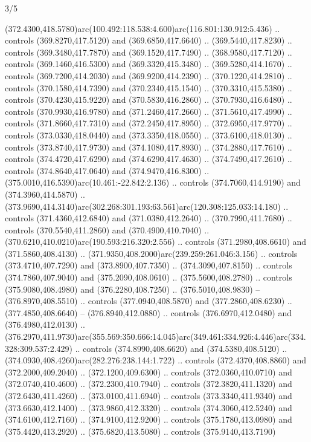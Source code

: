 \begin{flagdescription}{3/5}
\begin{scope}[shift={(0.5\flaglength,0.5\flagwidth)},scale=\flagwidth/510]
\begin{scope}[y=0.80pt, x=0.80pt, yscale=-1.06, xscale=1.06,yshift=-240pt,xshift=-400pt]
\begin{scope}[cm={{0.83333,0.0,0.0,0.83333,(154.64672,48.64761)}}]
\begin{scope}[cm={{0.93334,0.0,0.0,0.93334,(-4.86471,22.64035)}}]
\begin{scope}[draw=black]
  (372.4300,418.5780)arc(100.492:118.538:4.600)arc(116.801:130.912:5.436) ..
  controls (369.8270,417.5120) and (369.6850,417.6640) .. (369.5440,417.8230) ..
  controls (369.3480,417.7870) and (369.1520,417.7490) .. (368.9580,417.7120) ..
  controls (369.1460,416.5300) and (369.3320,415.3480) .. (369.5280,414.1670) ..
  controls (369.7200,414.2030) and (369.9200,414.2390) .. (370.1220,414.2810) ..
  controls (370.1580,414.7390) and (370.2340,415.1540) .. (370.3310,415.5380) ..
  controls (370.4230,415.9220) and (370.5830,416.2860) .. (370.7930,416.6480) ..
  controls (370.9930,416.9780) and (371.2460,417.2660) .. (371.5610,417.4990) ..
  controls (371.8660,417.7310) and (372.2450,417.8950) .. (372.6950,417.9770) ..
  controls (373.0330,418.0440) and (373.3350,418.0550) .. (373.6100,418.0130) ..
  controls (373.8740,417.9730) and (374.1080,417.8930) .. (374.2880,417.7610) ..
  controls (374.4720,417.6290) and (374.6290,417.4630) .. (374.7490,417.2610) ..
  controls (374.8640,417.0640) and (374.9470,416.8300) ..
  (375.0010,416.5390)arc(10.461:-22.842:2.136) .. controls (374.7060,414.9190)
  and (374.3960,414.5870) ..
  (373.9690,414.3140)arc(302.268:301.193:63.561)arc(120.308:125.033:14.180) ..
  controls (371.4360,412.6840) and (371.0380,412.2640) .. (370.7990,411.7680) ..
  controls (370.5540,411.2860) and (370.4900,410.7040) ..
  (370.6210,410.0210)arc(190.593:216.320:2.556) .. controls (371.2980,408.6610)
  and (371.5860,408.4130) .. (371.9350,408.2000)arc(239.259:261.046:3.156) ..
  controls (373.4710,407.7290) and (373.8900,407.7350) .. (374.3090,407.8150) ..
  controls (374.7860,407.9040) and (375.2090,408.0610) .. (375.5600,408.2780) ..
  controls (375.9080,408.4980) and (376.2280,408.7250) .. (376.5010,408.9830) --
  (376.8970,408.5510) .. controls (377.0940,408.5870) and (377.2860,408.6230) ..
  (377.4850,408.6640) -- (376.8940,412.0880) .. controls (376.6970,412.0480) and
  (376.4980,412.0130) ..
  (376.2970,411.9730)arc(355.569:350.666:14.045)arc(349.461:334.926:4.446)arc(334.328:309.537:2.429)
  .. controls (374.8990,408.6620) and (374.5380,408.5120) ..
  (374.0930,408.4260)arc(282.276:238.144:1.722) .. controls (372.4370,408.8860)
  and (372.2000,409.2040) .. (372.1200,409.6300) .. controls (372.0360,410.0710)
  and (372.0740,410.4600) .. (372.2300,410.7940) .. controls (372.3820,411.1320)
  and (372.6430,411.4260) .. (373.0100,411.6940) .. controls (373.3340,411.9340)
  and (373.6630,412.1400) .. (373.9860,412.3320) .. controls (374.3060,412.5240)
  and (374.6100,412.7160) .. (374.9100,412.9200) .. controls (375.1780,413.0980)
  and (375.4420,413.2920) .. (375.6820,413.5080) .. controls (375.9140,413.7190)

\end{scope}
\end{scope}
\end{scope}
\end{scope}
\end{scope}
\end{flagdescription}
